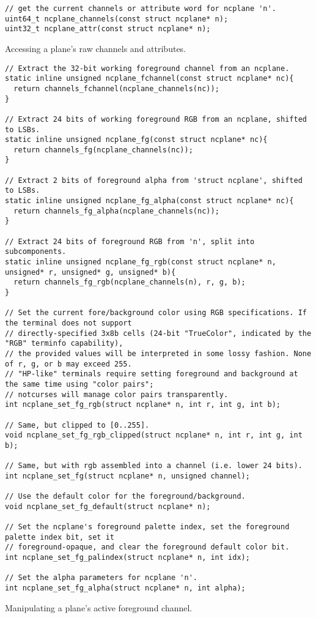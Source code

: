 \begin{listing}[!htb]
\begin{verbatim}
// get the current channels or attribute word for ncplane 'n'.
uint64_t ncplane_channels(const struct ncplane* n);
uint32_t ncplane_attr(const struct ncplane* n);
\end{verbatim}
\caption{Accessing a plane's raw channels and attributes.}
\label{listing:planeraw}
\end{listing}

\begin{listing}[!htb]
\begin{verbatim}
// Extract the 32-bit working foreground channel from an ncplane.
static inline unsigned ncplane_fchannel(const struct ncplane* nc){
  return channels_fchannel(ncplane_channels(nc));
}

// Extract 24 bits of working foreground RGB from an ncplane, shifted to LSBs.
static inline unsigned ncplane_fg(const struct ncplane* nc){
  return channels_fg(ncplane_channels(nc));
}

// Extract 2 bits of foreground alpha from 'struct ncplane', shifted to LSBs.
static inline unsigned ncplane_fg_alpha(const struct ncplane* nc){
  return channels_fg_alpha(ncplane_channels(nc));
}

// Extract 24 bits of foreground RGB from 'n', split into subcomponents.
static inline unsigned ncplane_fg_rgb(const struct ncplane* n, unsigned* r, unsigned* g, unsigned* b){
  return channels_fg_rgb(ncplane_channels(n), r, g, b);
}

// Set the current fore/background color using RGB specifications. If the terminal does not support
// directly-specified 3x8b cells (24-bit "TrueColor", indicated by the "RGB" terminfo capability),
// the provided values will be interpreted in some lossy fashion. None of r, g, or b may exceed 255.
// "HP-like" terminals require setting foreground and background at the same time using "color pairs";
// notcurses will manage color pairs transparently.
int ncplane_set_fg_rgb(struct ncplane* n, int r, int g, int b);

// Same, but clipped to [0..255].
void ncplane_set_fg_rgb_clipped(struct ncplane* n, int r, int g, int b);

// Same, but with rgb assembled into a channel (i.e. lower 24 bits).
int ncplane_set_fg(struct ncplane* n, unsigned channel);

// Use the default color for the foreground/background.
void ncplane_set_fg_default(struct ncplane* n);

// Set the ncplane's foreground palette index, set the foreground palette index bit, set it
// foreground-opaque, and clear the foreground default color bit.
int ncplane_set_fg_palindex(struct ncplane* n, int idx);

// Set the alpha parameters for ncplane 'n'.
int ncplane_set_fg_alpha(struct ncplane* n, int alpha);
\end{verbatim}
\caption{Manipulating a plane's active foreground channel.}
\label{listing:planefg}
\end{listing}

